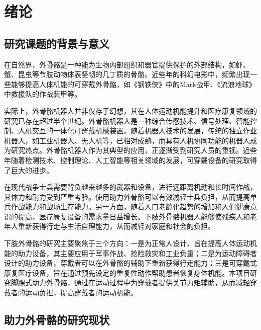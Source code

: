 \chapter{绪论}
\section{研究课题的背景与意义}
在自然界，外骨骼是一种能为生物内部组织和器官提供保护的外部结构，如虾、蟹、昆虫等节肢动物体表坚韧的几丁质的骨骼。近些年的科幻电影中，频繁出现一些能够提高人体机能的可穿戴外骨骼，如《钢铁侠》中的Mark战甲、《流浪地球》中救援队的作战装甲等。

实际上，外骨骼机器人并非仅存于幻想，其在人体运动机能提升\cite{p1}和医疗康复\cite{p2}领域的研究已存在超过半个世纪。外骨骼机器人是一种综合传感技术、信号处理、智能控制、人机交互的一体化可穿戴机械装置。随着机器人技术的发展，传统的独立作业机器人，如工业机器人、无人机等，已相对成熟，而具有人机协同功能的机器人成为研究热点。外骨骼机器人作为其典型的应用，正逐渐受到研究人员的重视。近些年随着检测技术、控制理论、人工智能等相关领域的发展，可穿戴设备的研究取得了巨大的进步。

在现代战争士兵需要背负越来越多的武器和设备，进行远距离机动和长时间作战，其体力和耐力受到严重考验。使用助力外骨骼可以有效减轻士兵负担，从而提高单兵作战能力和战场生存能力。另一方面，随着人口老龄化趋势的增加和人们健康意识的提高，医疗康复设备的需求量日益增长。下肢外骨骼机器人能够使残疾人和老年人重新获得行走与生活自理能力，从而减轻对家庭和社会的负担。

下肢外骨骼的研究主要聚焦于三个方向：一是为正常人设计、旨在提高人体运动机能的助力设备，其主要应用于军事作战、抢险救灾和工业负重；二是为运动障碍者设计的助力设备，穿戴者可以在外骨骼的辅助下重新获得行走能力；三是可穿戴式康复医疗设备，旨在通过预先设定的重复性动作帮助患者恢复身体机能。本项目研究脚踝式助力外骨骼，通过在运动过程中为穿戴者提供关节力矩辅助，从而减轻穿戴者的运动负担，提高穿戴者的运动机能。

\section{助力外骨骼的研究现状}

